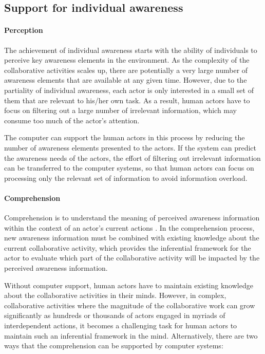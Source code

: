 \subsection{Support for individual awareness} %
\label{sub:support_for_individual_awareness}
\paragraph*{Perception} %
\label{par:perception}
The achievement of individual awareness starts with the ability of individuals to perceive key awareness elements in the environment. As the complexity of the collaborative activities scales up, there are potentially a very large number of awareness elements that are available at any given time. However, due to the partiality of individual awareness, each actor is only interested in a small set of them that are relevant to his/her own task. As a result, human actors have to focus on filtering out a large number of irrelevant information, which may consume too much of the actor's attention. 

The computer can support the human actors in this process by reducing the number of awareness elements presented to the actors. If the system can predict the awareness needs of the actors, the effort of filtering out irrelevant information can be transferred to the computer systems, so that human actors can focus on processing only the relevant set of information to avoid information overload.

\paragraph*{Comprehension} %
\label{par:comprehension}
Comprehension is to understand the meaning of perceived awareness information within the context of an actor's current actions \cite{oulasvirta2007a}. In the comprehension process, new awareness information must be combined with existing knowledge about the current collaborative activity, which provides the inferential framework \cite{carroll2003a} for the actor to evaluate which part of the collaborative activity will be impacted by the perceived awareness information. 

Without computer support, human actors have to maintain existing knowledge about the collaborative activities in their minds. However, in complex, collaborative activities where the magnitude of the collaborative work can grow significantly as hundreds or thousands of actors engaged in myriads of interdependent actions, it becomes a challenging task for human actors to maintain such an inferential framework in the mind. Alternatively, there are two ways that the comprehension can be supported by computer systems: 


